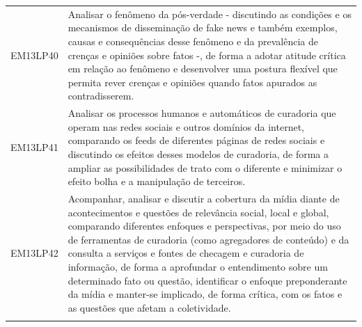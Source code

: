 \documentclass[12pt]{extarticle}
\begin{document}
\begin{longtable}{ll}
EM13LP40   & Analisar o fenômeno da pós-verdade - discutindo as condições e os mecanismos de disseminação de fake news e também exemplos, causas e consequências desse fenômeno e da prevalência de crenças e opiniões sobre fatos -, de forma a adotar atitude crítica em relação ao fenômeno e desenvolver uma postura flexível que permita rever crenças e opiniões quando fatos apurados as contradisserem.                                                                                                                                                                                                                                                                                                                                                                                                                    \\
\rowcolor[HTML]{E0F7FA} 
EM13LP41   & Analisar os processos humanos e automáticos de curadoria que operam nas redes sociais e outros domínios da internet, comparando os feeds de diferentes páginas de redes sociais e discutindo os efeitos desses modelos de curadoria, de forma a ampliar as possibilidades de trato com o diferente e minimizar o efeito bolha e a manipulação de terceiros.                                                                                                                                                                                                                                                                                                                                                                                                                                                           \\
\rowcolor[HTML]{FFF} 
EM13LP42   & Acompanhar, analisar e discutir a cobertura da mídia diante de acontecimentos e questões de relevância social, local e global, comparando diferentes enfoques e perspectivas, por meio do uso de ferramentas de curadoria (como agregadores de conteúdo) e da consulta a serviços e fontes de checagem e curadoria de informação, de forma a aprofundar o entendimento sobre um determinado fato ou questão, identificar o enfoque preponderante da mídia e manter-se implicado, de forma crítica, com os fatos e as questões que afetam a coletividade.                                                                                                                                                                                                                                                              \\
\rowcolor[HTML]{E0F7FA} 

\end{longtable}
\end{document}
